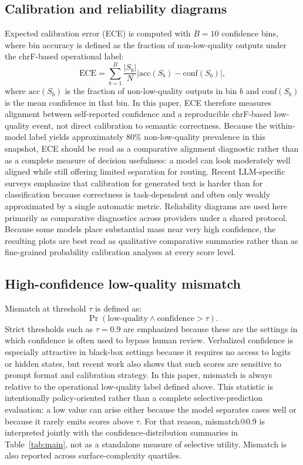 \documentclass[10pt,conference]{IEEEtran}
\begin{document}
\subsection{Calibration and reliability diagrams}
Expected calibration error (ECE) is computed with $B=10$ confidence bins, where bin accuracy is defined as the fraction of non-low-quality outputs under the chrF-based operational label:
\[
\mathrm{ECE}=\sum_{b=1}^{B}\frac{|S_b|}{N}\left|\mathrm{acc}(S_b)-\mathrm{conf}(S_b)\right|,
\]
where $\mathrm{acc}(S_b)$ is the fraction of non-low-quality outputs in bin $b$ and $\mathrm{conf}(S_b)$ is the mean confidence in that bin. In this paper, ECE therefore measures alignment between self-reported confidence and a reproducible chrF-based low-quality event, not direct calibration to semantic correctness. Because the within-model label yields approximately 80\% non-low-quality prevalence in this snapshot, ECE should be read as a comparative alignment diagnostic rather than as a complete measure of decision usefulness: a model can look moderately well aligned while still offering limited separation for routing. Recent LLM-specific surveys emphasize that calibration for generated text is harder than for classification because correctness is task-dependent and often only weakly approximated by a single automatic metric. Reliability diagrams are used here primarily as comparative diagnostics across providers under a shared protocol. Because some models place substantial mass near very high confidence, the resulting plots are best read as qualitative comparative summaries rather than as fine-grained probability calibration analyses at every score level.

\subsection{High-confidence low-quality mismatch}
Mismatch at threshold $\tau$ is defined as:
\[
\Pr(\mathrm{low\mbox{-}quality} \wedge \mathrm{confidence}>\tau).
\]
Strict thresholds such as $\tau = 0.9$ are emphasized because these are the settings in which confidence is often used to bypass human review. Verbalized confidence is especially attractive in black-box settings because it requires no access to logits or hidden states, but recent work also shows that such scores are sensitive to prompt format and calibration strategy. In this paper, mismatch is always relative to the operational low-quality label defined above. This statistic is intentionally policy-oriented rather than a complete selective-prediction evaluation: a low value can arise either because the model separates cases well or because it rarely emits scores above $\tau$. For that reason, mismatch@0.9 is interpreted jointly with the confidence-distribution summaries in Table~\ref{tab:main}, not as a standalone measure of selective utility. Mismatch is also reported across surface-complexity quartiles.
\end{document}
